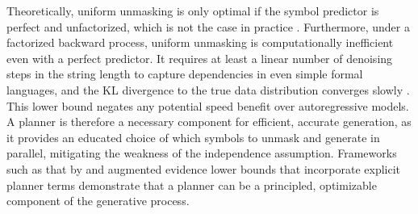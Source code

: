 Theoretically, uniform unmasking is only optimal if the symbol predictor is perfect and unfactorized, which is not the case in practice \citep{peng2025pathplanningmaskeddiffusion}.
Furthermore, under a factorized backward process, uniform unmasking is computationally inefficient even with a perfect predictor.
It requires at least a linear number of denoising steps in the string length to capture dependencies in even simple formal languages, and the KL divergence to the true data distribution converges slowly \citep{feng2025theoreticalbenefitlimitationdiffusion,li2025convergencetheorydiffusionlanguage}.
This lower bound negates any potential speed benefit over autoregressive models.
A planner is therefore a necessary component for efficient, accurate generation, as it provides an educated choice of which symbols to unmask and generate in parallel, mitigating the weakness of the independence assumption.
Frameworks such as that by \citet{zheng2024reparameterizeddiscretediffusionmodel} and augmented \MDMAcr evidence lower bounds that incorporate explicit planner terms \citep{peng2025pathplanningmaskeddiffusion,liu2025thinkgeneratediscretediffusion} demonstrate that a planner can be a principled, optimizable component of the generative process.

